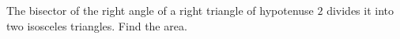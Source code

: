 The bisector of the right angle of a right triangle of hypotenuse $2$ divides it into two isosceles triangles. Find the area.
